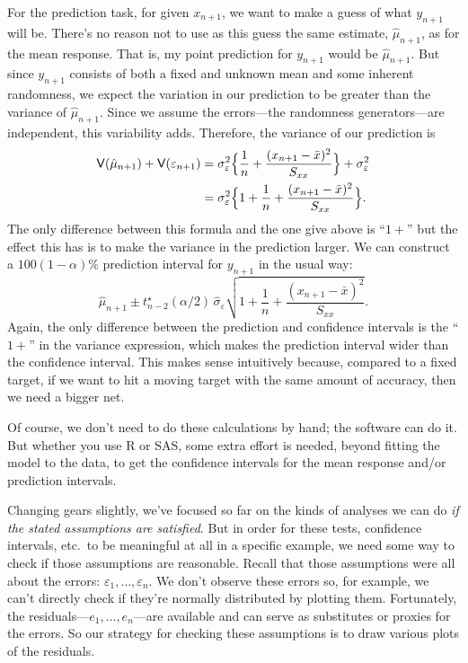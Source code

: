 \documentclass[a4paper, 12pt]{article}
\theoremstyle{plain}
\theoremstyle{definition}
\theoremstyle{remark}
\newcommand{\var}{\mathsf{V}}
\newcommand{\eps}{\varepsilon}
\begin{document}
For the prediction task, for given $x_{n+1}$, we want to make a guess of what $y_{n+1}$ will be.  There's no reason not to use as this guess the same estimate, $\hat\mu_{n+1}$, as for the mean response.  That is, my point prediction for $y_{n+1}$ would be $\hat\mu_{n+1}$.  But since $y_{n+1}$ consists of both a fixed and unknown mean and some inherent randomness, we expect the variation in our prediction to be greater than the variance of $\hat\mu_{n+1}$.  Since we assume the errors---the randomness generators---are independent, this variability adds.  Therefore, the variance of our prediction is 
\begin{align*} 
\var(\hat\mu_{n+1}) + \var(\eps_{n+1}) & = \sigma_\eps^2 \Bigl\{ \frac1n + \frac{(x_{n+1} - \bar x)^2}{S_{xx}} \Bigr\} + \sigma_\eps^2 \\
& = \sigma_\eps^2 \Bigl\{ 1 + \frac1n + \frac{(x_{n+1} - \bar x)^2}{S_{xx}} \Bigr\}.
\end{align*}
The only difference between this formula and the one give above is ``$1+$'' but the effect this has is to make the variance in the prediction larger.  We can construct a $100(1-\alpha)$\% prediction interval for $y_{n+1}$ in the usual way:
\[ \hat\mu_{n+1} \pm t_{n-2}^\star(\alpha/2) \, \hat\sigma_\eps \sqrt{1 + \frac1n + \frac{(x_{n+1} - \bar x)^2}{S_{xx}}}. \]
Again, the only difference between the prediction and confidence intervals is the ``$1+$'' in the variance expression, which makes the prediction interval wider than the confidence interval.  This makes sense intuitively because, compared to a fixed target, if we want to hit a moving target with the same amount of accuracy, then we need a bigger net.  

Of course, we don't need to do these calculations by hand; the software can do it.  But whether you use R or SAS, some extra effort is needed, beyond fitting the model to the data, to get the confidence intervals for the mean response and/or prediction intervals.  %

Changing gears slightly, we've focused so far on the kinds of analyses we can do {\em if the stated assumptions are satisfied}.  But in order for these tests, confidence intervals, etc.~to be meaningful at all in a specific example, we need some way to check if those assumptions are reasonable.  Recall that those assumptions were all about the errors: $\eps_1,\ldots,\eps_n$.  We don't observe these errors so, for example, we can't directly check if they're normally distributed by plotting them.  Fortunately, the residuals---$e_1,\ldots,e_n$---are available and can serve as substitutes or proxies for the errors.  So our strategy for checking these assumptions is to draw various plots of the residuals.  %
\end{document}
